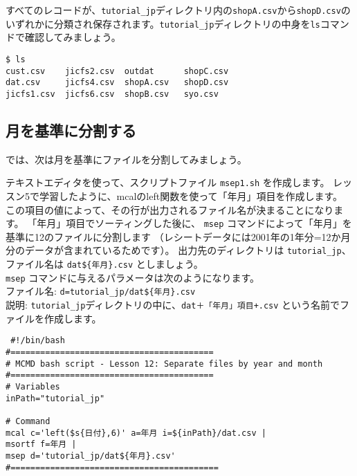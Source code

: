 すべてのレコードが、\verb|tutorial_jp|ディレクトリ内の\verb|shopA.csv|から\verb|shopD.csv|のいずれかに分類され保存されます。\verb|tutorial_jp|ディレクトリの中身を\verb|ls|コマンドで確認してみましょう。\\

\begin{verbatim}
$ ls
cust.csv	jicfs2.csv	outdat		shopC.csv
dat.csv		jicfs4.csv	shopA.csv	shopD.csv
jicfs1.csv	jicfs6.csv	shopB.csv	syo.csv
\end{verbatim}

\subsection{月を基準に分割する}
 
 では、次は月を基準にファイルを分割してみましょう。\\
 
 {\setlength{\parindent}{0cm}
 
テキストエディタを使って、スクリプトファイル \verb|msep1.sh| を作成します。
レッスン5で学習したように、mcalのleft関数を使って「年月」項目を作成します。
この項目の値によって、その行が出力されるファイル名が決まることになります。
「年月」項目でソーティングした後に、 \verb|msep| コマンドによって「年月」を基準に12のファイルに分割します
（レシートデータには2001年の1年分=12か月分のデータが含まれているためです）。
出力先のディレクトリは \verb|tutorial_jp|、ファイル名は \verb|dat${年月}.csv| としましょう。\\

\verb|msep| コマンドに与えるパラメータは次のようになります。\\

ファイル名: \verb|d=tutorial_jp/dat${年月}.csv| \\
説明: \verb|tutorial_jp|ディレクトリの中に、\verb|dat＋「年月」項目+.csv| という名前でファイルを作成します。
}
 
\begin{verbatim}
 #!/bin/bash
#=========================================
# MCMD bash script - Lesson 12: Separate files by year and month
#=========================================
# Variables
inPath="tutorial_jp"

# Command 
mcal c='left($s{日付},6)' a=年月 i=${inPath}/dat.csv |
msortf f=年月 |
msep d='tutorial_jp/dat${年月}.csv'
#==========================================
\end{verbatim}
 
